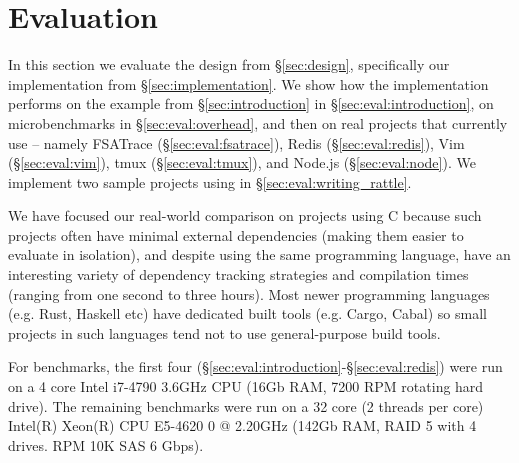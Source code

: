 \section{Evaluation}
\label{sec:evaluation}

In this section we evaluate the design from \S\ref{sec:design}, specifically our implementation from \S\ref{sec:implementation}. We show how the implementation performs on the example from \S\ref{sec:introduction} in \S\ref{sec:eval:introduction}, on microbenchmarks in \S\ref{sec:eval:overhead}, and then on real projects that currently use \Make{} -- namely FSATrace (\S\ref{sec:eval:fsatrace}), Redis (\S\ref{sec:eval:redis}), Vim (\S\ref{sec:eval:vim}), tmux (\S\ref{sec:eval:tmux}), and Node.js (\S\ref{sec:eval:node}). We implement two sample projects using \Rattle in \S\ref{sec:eval:writing_rattle}.

We have focused our real-world comparison on \Make projects using C because such projects often have minimal external dependencies (making them easier to evaluate in isolation), and despite using the same programming language, have an interesting variety of dependency tracking strategies and compilation times (ranging from one second to three hours). Most newer programming languages (e.g. Rust, Haskell etc) have dedicated built tools (e.g. Cargo, Cabal) so small projects in such languages tend not to use general-purpose build tools.



For benchmarks, the first four (\S\ref{sec:eval:introduction}-\S\ref{sec:eval:redis}) were run on a 4 core Intel i7-4790 3.6GHz CPU (16Gb RAM, 7200 RPM rotating hard drive). The remaining benchmarks were run on a 32 core (2 threads per core) Intel(R) Xeon(R) CPU E5-4620 0 @ 2.20GHz (142Gb RAM, RAID 5 with 4 drives. RPM 10K SAS 6 Gbps).

